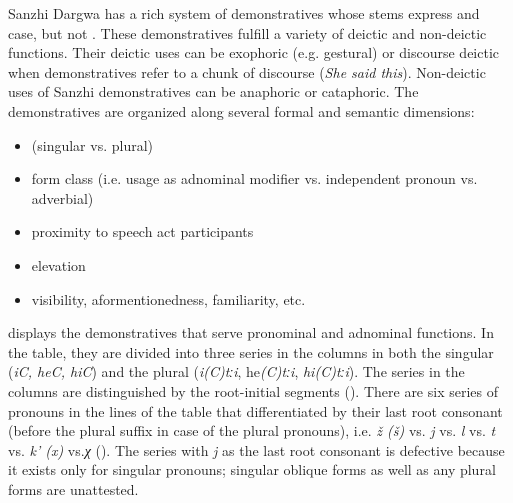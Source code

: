 Sanzhi Dargwa has a rich system of demonstratives whose stems express  and case, but not . These demonstratives fulfill a variety of deictic and non-deictic functions. Their deictic uses can be exophoric (e.g. gestural) or discourse deictic when demonstratives refer to a chunk of discourse (\textit{She said this}). Non-deictic uses of Sanzhi demonstratives can be anaphoric or cataphoric. The demonstratives are organized along several formal and semantic dimensions:
%

\begin{itemize}
	\item	{} (singular vs. plural)
	\item	form class (i.e. usage as adnominal modifier vs. independent pronoun vs. adverbial) 
	\item	proximity to speech act participants
	\item	elevation
	\item	visibility, aformentionedness, familiarity, etc.
\end{itemize}
%

 displays the demonstratives that serve pronominal and adnominal functions. In the table, they are divided into three series in the columns in both the singular (\textit{iC, heC, hiC}) and the plural (\textit{i(C)tːi}, he\textit{(C)tːi}, \textit{hi(C)tːi}). The series in the columns are distinguished by the root-initial segments (). There are six series of pronouns in the lines of the table that differentiated by their last root consonant (before the plural suffix in case of the plural pronouns), i.e. \textit{ž (š)} vs. \textit{j} vs. \textit{l} vs. \textit{t} vs. \textit{k' (x)} vs.\textit{χ} (). The series with \textit{j} as the last root consonant is defective because it exists only for singular  pronouns; singular oblique forms as well as any plural forms are unattested.

